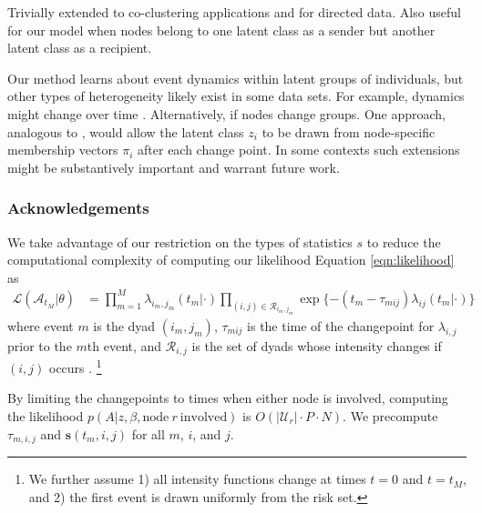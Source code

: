 \documentclass{article}
\begin{document}
Trivially extended to co-clustering applications and for directed data.  Also useful for our model when nodes belong to one latent class as a sender but another latent class as a recipient.

Our method learns about event dynamics within latent groups of individuals, but other types of heterogeneity likely exist in some data sets.  For example, dynamics might change over time \cite{Vu2011}.  Alternatively, if nodes change groups.  One approach, analogous to \cite{Airoldi2008}, would allow the latent class $z_i$ to be drawn from node-specific membership vectors $\pi_i$  after each change point.  In some contexts such extensions might be substantively important and warrant future work.

\subsubsection*{Acknowledgements}





We take advantage of our restriction on the types of statistics $s$ to reduce the computational complexity of computing our likelihood
 Equation \ref{eqn:likelihood} as 
\begin{align*}
\mathcal{L}(\mathcal{A}_{t_M}|\theta) &= \prod_{m=1}^M \lambda_{i_m,j_m}(t_m|\cdot) \prod_{(i,j) \in \mathcal{R}_{i_m,j_m}}\exp\{ - (t_m - \tau_{mij}) \lambda_{ij}(t_m | \cdot) \}
\end{align*}
\noindent where event $m$ is the dyad $(i_m,j_m)$, $\tau_{mij}$ is the time  of the changepoint for $\lambda_{i,j}$ prior to the $m$th event, and $\mathcal{R}_{i,j}$ is the set of dyads whose intensity changes if $(i,j)$ occurs  \cite{Butts2008}. \footnote{We further assume 1) all intensity functions change at times $t=0$ and $t=t_M$, and 2) the first event is drawn uniformly from the risk set.}

 By limiting the changepoints to times when either node is involved, computing the likelihood $p(A|z,\beta,\mbox{node} \ r \ \mbox{involved})$ is $O(|\mathcal{U}_r| \cdot P \cdot N)$.  We precompute $\tau_{m,i,j}$ and $\mathbf{s}(t_m,i,j)$ for all $m$, $i$, and $j$. 

\end{document}
